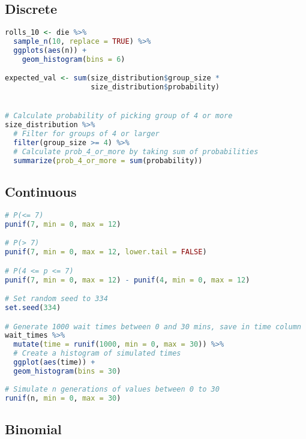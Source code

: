 \documentclass[11pt]{article}
\begin{document}
\subsection{Discrete}

\begin{lstlisting}[language=R]
rolls_10 <- die %>%
  sample_n(10, replace = TRUE) %>%
  ggplots(aes(n)) + 
    geom_histogram(bins = 6)

expected_val <- sum(size_distribution$group_size *
                    size_distribution$probability)


# Calculate probability of picking group of 4 or more
size_distribution %>%
  # Filter for groups of 4 or larger
  filter(group_size >= 4) %>%
  # Calculate prob_4_or_more by taking sum of probabilities
  summarize(prob_4_or_more = sum(probability))
\end{lstlisting}

\subsection{Continuous}

\begin{lstlisting}[language=R]
# P(<= 7)
punif(7, min = 0, max = 12)

# P(> 7)
punif(7, min = 0, max = 12, lower.tail = FALSE)

# P(4 <= p <= 7)
punif(7, min = 0, max = 12) - punif(4, min = 0, max = 12)

# Set random seed to 334
set.seed(334)

# Generate 1000 wait times between 0 and 30 mins, save in time column
wait_times %>%
  mutate(time = runif(1000, min = 0, max = 30)) %>%
  # Create a histogram of simulated times
  ggplot(aes(time)) +
  geom_histogram(bins = 30)
  
# Simulate n generations of values between 0 to 30
runif(n, min = 0, max = 30)
\end{lstlisting}

\subsection{Binomial}
\end{document}
